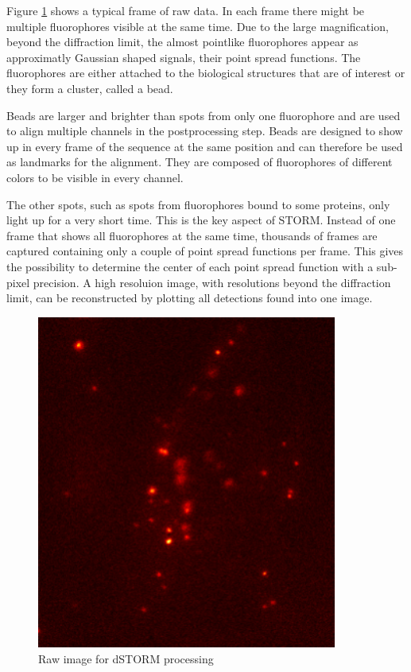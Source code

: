 Figure \ref{rawStorm} shows a typical frame of raw data. In each frame there might be multiple fluorophores visible at the same time. Due to the large magnification, beyond the diffraction limit, the almost pointlike fluorophores appear as approximatly Gaussian shaped signals, their point spread functions. The fluorophores are either attached to the biological structures that are of interest or they form a cluster, called a bead.\newline

Beads are larger and brighter than spots from only one fluorophore and are used to align multiple channels in the postprocessing step. Beads are designed to show up in every frame of the sequence at the same position and can therefore be used as landmarks for the alignment. They are composed of fluorophores of different colors to be visible in every channel.\newline

The other spots, such as spots from fluorophores bound to some proteins, only light up for a very short time. This is the key aspect of STORM. Instead of one frame that shows all fluorophores at the same time, thousands of frames are captured containing only a couple of point spread functions per frame. This gives the possibility to determine the center of each point spread function with a sub-pixel precision. A high resoluion image, with resolutions beyond the diffraction limit, can be reconstructed by plotting all detections found into one image.

\begin{figure}
\centering
\includegraphics[width = 0.88\textwidth]{pictures/Pos2_2_red2-2frame2475Color.png}
	\caption{Raw image for dSTORM processing}
	\label{rawStorm}
\end{figure}


